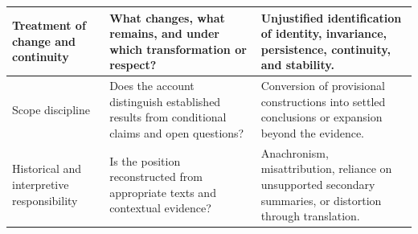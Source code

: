 \begin{table}[htbp]
\begin{tabular}{|p{}|p{}|p{}|}
Treatment of change and continuity
&
What changes, what remains, and under which transformation or respect?
&
Unjustified identification of identity, invariance, persistence, continuity, and stability.
\\
\hline

Scope discipline
&
Does the account distinguish established results from conditional claims and open questions?
&
Conversion of provisional constructions into settled conclusions or expansion beyond the evidence.
\\
\hline

Historical and interpretive responsibility
&
Is the position reconstructed from appropriate texts and contextual evidence?
&
Anachronism, misattribution, reliance on unsupported secondary summaries, or distortion through translation.
\\
\hline

\end{tabular}

\end{table}

